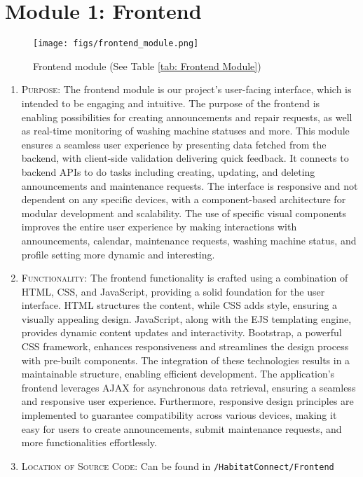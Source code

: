 \documentclass[conference]{IEEEtran}
\begin{document}
\section*{Module 1: Frontend}
\begin{figure}[H]
\centering
\texttt{[image: figs/frontend\_module.png]}
\caption{Frontend module (See Table \ref{tab: Frontend Module})}
\label{fig:Frontend module}
\end{figure}
\begin{enumerate}
    \item \textsc{Purpose:} The frontend module is our project's user-facing interface, which is intended to be engaging and intuitive. The purpose of the frontend is enabling possibilities for creating announcements and repair requests, as well as real-time monitoring of washing machine statuses and more. This module ensures a seamless user experience by presenting data fetched from the backend, with client-side validation delivering quick feedback. It connects to backend APIs to do tasks including creating, updating, and deleting announcements and maintenance requests. The interface is responsive and not dependent on any specific devices, with a component-based architecture for modular development and scalability. The use of specific visual components improves the entire user experience by making interactions with announcements, calendar, maintenance requests, washing machine status, and profile setting more dynamic and interesting.
    \item \textsc{Functionality:} The frontend functionality is crafted using a combination of HTML, CSS, and JavaScript, providing a solid foundation for the user interface. HTML structures the content, while CSS adds style, ensuring a visually appealing design. JavaScript, along with the EJS templating engine, provides dynamic content updates and interactivity. Bootstrap, a powerful CSS framework, enhances responsiveness and streamlines the design process with pre-built components. The integration of these technologies results in a maintainable structure, enabling efficient development. The application's frontend leverages AJAX for asynchronous data retrieval, ensuring a seamless and responsive user experience. Furthermore, responsive design principles are implemented to guarantee compatibility across various devices, making it easy for users to create announcements, submit maintenance requests, and more functionalities effortlessly.
    \item \textsc{Location of Source Code:} Can be found in \texttt{/HabitatConnect/Frontend}

\end{enumerate}
\end{document}

